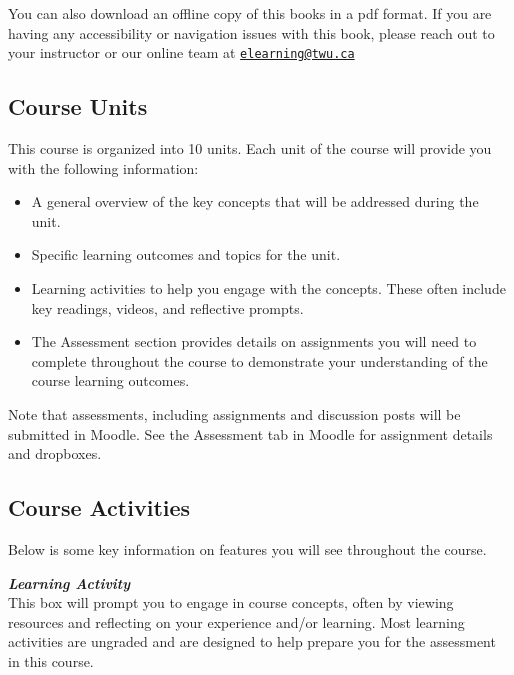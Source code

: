 \documentclass[
]{book}
\providecommand{\tightlist}{%
  \setlength{\itemsep}{0pt}\setlength{\parskip}{0pt}}
\theoremstyle{definition}
\theoremstyle{definition}
\theoremstyle{definition}
\theoremstyle{definition}
\theoremstyle{remark}
\begin{document}
You can also download an offline copy of this books in a pdf format. If you are having any accessibility or navigation issues with this book, please reach out to your instructor or our online team at \href{mailto:elearning@twu.ca}{\nolinkurl{elearning@twu.ca}}

\hypertarget{course-units}{%
\subsection*{Course Units}\label{course-units}}

This course is organized into 10 units. Each unit of the course will provide you with the following information:

\begin{itemize}
\tightlist
\item
  A general overview of the key concepts that will be addressed during the unit.
\item
  Specific learning outcomes and topics for the unit.
\item
  Learning activities to help you engage with the concepts. These often include key readings, videos, and reflective prompts.
\item
  The Assessment section provides details on assignments you will need to complete throughout the course to demonstrate your understanding of the course learning outcomes.
\end{itemize}

\begin{caution}
 Note that assessments, including assignments and discussion posts will
 be submitted in Moodle. See the Assessment tab in Moodle for assignment
 details and dropboxes.
 \end{caution}

\hypertarget{course-activities}{%
\subsection*{Course Activities}\label{course-activities}}

Below is some key information on features you will see throughout the course.

\begin{reflect}
\textbf{\emph{Learning Activity}}\\
This box will prompt you to engage in course concepts, often by viewing
resources and reflecting on your experience and/or learning. Most
learning activities are ungraded and are designed to help prepare you
for the assessment in this course.
\end{reflect}
\end{document}

